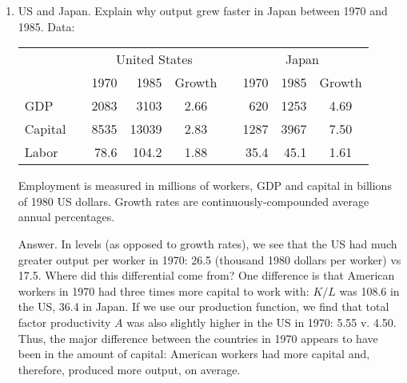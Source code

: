 \begin{enumerate}
Answer.
\begin{enumerate}
\item The growth rate of output is
\begin{eqnarray*}
    \gamma_Y &=& [\ln (50) - \ln (10)]/(2000-1950) \;\;=\;\; 0.0322 ,
\end{eqnarray*}
or 3.22\% per year.
A similar calculation gives us $\gamma_L = 0.0081$ = 0.81\% per year.
\item We can do this two ways.  The easiest is
\begin{eqnarray*}
    \gamma_{Y/L} &=& \gamma_{Y} - \gamma_{L} \;\;=\;\; 0.0241.
\end{eqnarray*}
You can also do it directly using the same method we used in (a).
\end{enumerate}


\item US and Japan.
Explain why output grew faster in Japan between 1970 and 1985.
Data:
%
\begin{center}
\small
\begin{tabular*}{0.9\textwidth}{lcrrccrrc}
\toprule
&&  \multicolumn{3}{c}{United States} && \multicolumn{3}{c}{Japan}        \\
                        \cmidrule{3-5}  \cmidrule{7-9}
&&              1970  & 1985 & Growth && 1970 & 1985 & Growth \\
\midrule
GDP && 2083 &  3103  &  2.66    &  &   620  & 1253  &  4.69   \\
Capital      && 8535 & 13039  &  2.83    &  &  1287  & 3967  &  7.50   \\
Labor  && 78.6 & 104.2  &  1.88    &  &  35.4  & 45.1  &  1.61   \\
\bottomrule
\end{tabular*}
\end{center}
%
Employment is measured in millions of workers,
GDP and capital in
billions of 1980 US dollars.
Growth rates are continuously-compounded average annual percentages.

Answer.
In levels (as opposed to growth rates), we see that
the US had much greater output per worker in 1970:
26.5 (thousand 1980 dollars per worker) vs 17.5.
Where did this differential come from?  One difference is that American
workers in 1970 had three times more capital to work with:
$K/L$ was 108.6 in the US, 36.4 in Japan.  If we use our production
function, we find that total factor productivity $A$
was also slightly higher in the US in 1970:  5.55 v. 4.50.
Thus, the major difference between the countries in
1970 appears to have been in the amount of capital:  American workers had more
capital and, therefore, produced more output, on average.


\end{enumerate}
